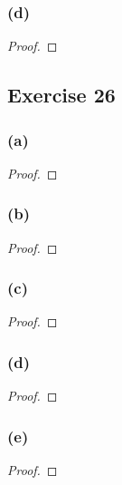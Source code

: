 \documentclass[14pt]{extarticle}
\begin{document}
\subsubsection{(d)}

\begin{proof}

\end{proof}

\subsection{Exercise 26}

\subsubsection{(a)}

\begin{proof}

\end{proof}

\subsubsection{(b)}

\begin{proof}

\end{proof}

\subsubsection{(c)}

\begin{proof}

\end{proof}

\subsubsection{(d)}

\begin{proof}

\end{proof}

\subsubsection{(e)}

\begin{proof}

\end{proof}
\end{document}

